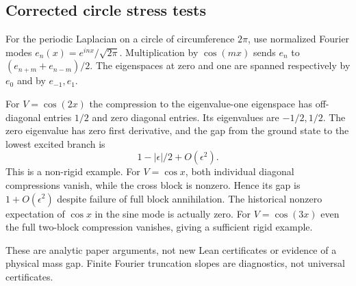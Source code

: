 \subsection{Corrected circle stress tests}
For the periodic Laplacian on a circle of circumference $2\pi$, use normalized Fourier modes $e_n(x)=e^{inx}/\sqrt{2\pi}$. Multiplication by $\cos(mx)$ sends $e_n$ to $(e_{n+m}+e_{n-m})/2$. The eigenspaces at zero and one are spanned respectively by $e_0$ and by $e_{-1},e_1$.

For $V=\cos(2x)$ the compression to the eigenvalue-one eigenspace has off-diagonal entries $1/2$ and zero diagonal entries. Its eigenvalues are $-1/2,1/2$. The zero eigenvalue has zero first derivative, and the gap from the ground state to the lowest excited branch is
\[
1-|\epsilon|/2+O(\epsilon^2).
\]
This is a non-rigid example. For $V=\cos x$, both individual diagonal compressions vanish, while the cross block is nonzero. Hence its gap is $1+O(\epsilon^2)$ despite failure of full block annihilation. The historical nonzero expectation of $\cos x$ in the sine mode is actually zero. For $V=\cos(3x)$ even the full two-block compression vanishes, giving a sufficient rigid example.

These are analytic paper arguments, not new Lean certificates or evidence of a physical mass gap. Finite Fourier truncation slopes are diagnostics, not universal certificates.
